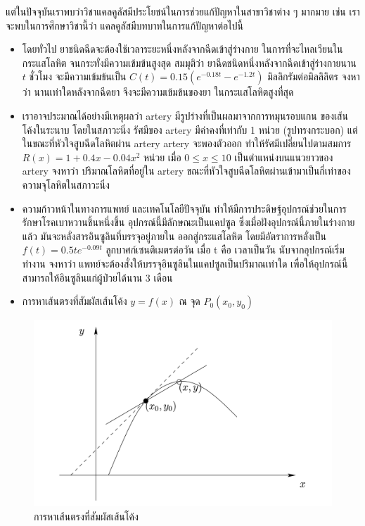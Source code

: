 \documentclass[
]{book}
\theoremstyle{definition}
\theoremstyle{definition}
\theoremstyle{definition}
\theoremstyle{definition}
\theoremstyle{remark}
\begin{document}
แต่ในปัจจุบันเราพบว่าวิชาแคลคูลัสมีประโยชน์ในการช่วยแก้ปัญหาในสาขาวิชาต่าง ๆ มากมาย เช่น
เราจะพบในการศึกษาวิชานี้ว่า แคลคูลัสมีบทบาทในการแก้ปัญหาต่อไปนี้

\begin{itemize}
\item
  โดยทั่วไป ยาชนิดฉีดจะต้องใช้เวลาระยะหนึ่งหลังจากฉีดเข้าสู่ร่างกาย
  ในการที่จะไหลเวียนในกระแสโลหิต จนกระทั่งมีความเข้มข้นสูงสุด สมมุติว่า
  ยาฉีดชนิดหนึ่งหลังจากฉีดเข้าสู่ร่างกายนาน \(t\) ชั่วโมง จะมีความเข้มข้นเป็น
  \(C(t) = 0.15(e^{-0.18t}-e^{-1.2t})\) มิลลิกรัมต่อมิลลิลิตร จงหาว่า
  นานเท่าใดหลังจากฉีดยา จึงจะมีความเข้มข้นของยา ในกระแสโลหิตสูงที่สุด
\item
  เราอาจประมาณได้อย่างมีเหตุผลว่า artery มีรูปร่างที่เป็นผลมาจากการหมุนรอบแกน
  ของเส้นโค้งในระนาบ โดยในสภาวะนิ่ง รัศมีของ artery มีค่าคงที่เท่ากับ 1 หน่วย
  (รูปทรงกระบอก) แต่ในขณะที่หัวใจสูบฉีดโลหิตผ่าน artery artery จะพองตัวออก
  ทำให้รัศมีเปลี่ยนไปตามสมการ \(R(x) = 1+0.4x-0.04x^{2}\) หน่วย เมื่อ
  \(0 \leq x\leq 10\) เป็นตำแหน่งบนแนวยาวของ artery จงหาว่า ปริมาณโลหิตที่อยู่ใน
  artery ขณะที่หัวใจสูบฉีดโลหิตผ่านเข้ามาเป็นกี่เท่าของความจุโลหิตในสภาวะนิ่ง
\item
  ความก้าวหน้าในทางการแพทย์ และเทคโนโลยีปัจจุบัน
  ทำให้มีการประดิษฐ์อุปกรณ์ช่วยในการรักษาโรคเบาหวานชิ้นหนึ่งขึ้น
  อุปกรณ์นี้มีลักษณะเป็นแคปซูล ซึ่งเมื่อฝังอุปกรณ์นี้ภายในร่างกายแล้ว
  มันจะหลั่งสารอินซูลินที่บรรจุอยู่ภายใน ออกสู่กระแสโลหิต โดยมีอัตราการหลั่งเป็น
  \(f\left( t\right) =0.5te^{-0.09t}\) ลูกบาศก์เซนติเมตรต่อวัน เมื่อ t คือ
  เวลาเป็นวัน นับจากอุปกรณ์เริ่มทำงาน จงหาว่า
  แพทย์จะต้องสั่งให้บรรจุอินซูลินในแคปซูลเป็นปริมาณเท่าใด
  เพื่อให้อุปกรณ์นี้สามารถให้อินซูลินแก่ผู้ป่วยได้นาน 3 เดือน
\item
  การหาเส้นตรงที่สัมผัสเส้นโค้ง \(y = f(x)\) ณ จุด \(P_{0}(x_{0},y_{0})\)
\end{itemize}

\begin{figure}

{\centering \includegraphics[width=0.5\linewidth]{images/fig-tangent-line} 

}

\caption{การหาเส้นตรงที่สัมผัสเส้นโค้ง}\label{fig:fig-tangent-line}
\end{figure}
\end{document}
